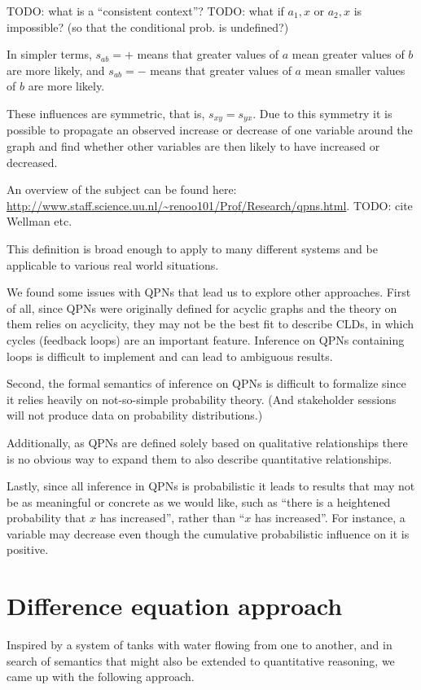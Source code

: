 \documentclass[a4paper,11pt]{article}
\begin{document}
TODO: what is a ``consistent context''?
TODO: what if $a_1,x$ or $a_2,x$ is impossible? (so that the conditional prob. is undefined?)

In simpler terms, $s_{ab} = +$ means that greater values of $a$ mean
greater values of $b$ are more likely, and $s_{ab}=-$ means that
greater values of $a$ mean smaller values of $b$ are more likely.

These influences are symmetric, that is, $s_{xy}=s_{yx}$.
%
Due to this symmetry it is possible to propagate an observed increase
or decrease of one variable around the graph and find whether other
variables are then likely to have increased or decreased.

An overview of the subject can be found here:
\url{http://www.staff.science.uu.nl/~renoo101/Prof/Research/qpns.html}.
TODO: cite Wellman etc.

This definition is broad enough to
apply to many different systems and
be applicable to various real world situations.

We found some issues with QPNs that lead us to explore other
approaches.
%
First of all, since QPNs were originally defined for acyclic graphs
and the theory on them relies on acyclicity, they may not be the best
fit to describe CLDs, in which cycles (feedback loops) are an important
feature.
%
Inference on QPNs containing loops is difficult to implement and can
lead to ambiguous results.

Second, the formal semantics of inference on QPNs is difficult to
formalize since it relies heavily on not-so-simple probability theory.
%
(And stakeholder sessions will not produce data on probability
distributions.)

Additionally, as QPNs are defined solely based on qualitative
relationships there is no obvious way to expand them to also describe
quantitative relationships.

Lastly, since all inference in QPNs is probabilistic it leads to
results that may not be as meaningful or concrete as we would like,
such as ``there is a heightened probability that $x$ has increased'',
rather than ``$x$ has increased''.
%
For instance, a variable may decrease even though the cumulative
probabilistic influence on it is positive.

\section{Difference equation approach}

Inspired by a system of tanks with water flowing from one to another,
and in search of semantics that might also be extended to quantitative
reasoning, we came up with the following approach.
\end{document}
